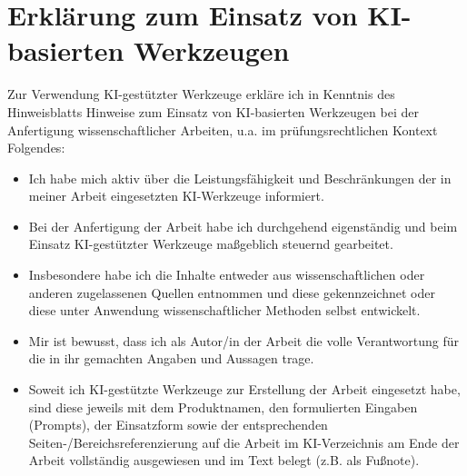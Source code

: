 \thispagestyle{fancy}

\section*{Erklärung zum Einsatz von KI-basierten Werkzeugen}

Zur Verwendung KI-gestützter Werkzeuge erkläre ich in Kenntnis des Hinweisblatts
\glqq{}Hinweise zum Einsatz von KI-basierten Werkzeugen bei der Anfertigung wissenschaftlicher Arbeiten, u.a. im prüfungsrechtlichen Kontext\grqq{} Folgendes:
    \begin{itemize}
    \item Ich habe mich aktiv über die Leistungsfähigkeit und Beschränkungen der in meiner Arbeit eingesetzten KI-Werkzeuge informiert.
    \item Bei der Anfertigung der Arbeit habe ich durchgehend eigenständig und beim Einsatz KI-gestützter Werkzeuge maßgeblich steuernd gearbeitet.
    \item Insbesondere habe ich die Inhalte entweder aus wissenschaftlichen oder anderen zugelassenen Quellen entnommen und diese gekennzeichnet oder diese unter Anwendung wissenschaftlicher Methoden selbst entwickelt.
    \item Mir ist bewusst, dass ich als Autor/in der Arbeit die volle Verantwortung für die in ihr gemachten Angaben und Aussagen trage.
    \item Soweit ich KI-gestützte Werkzeuge zur Erstellung der Arbeit eingesetzt habe, sind diese jeweils mit dem Produktnamen, den formulierten Eingaben (Prompts), der Einsatzform sowie der entsprechenden Seiten-/Bereichsreferenzierung auf die Arbeit im KI-Verzeichnis am Ende der Arbeit vollständig ausgewiesen und im Text belegt (z.B. als Fußnote). 
\end{itemize}

\newpage
\thispagestyle{fancy}

    \ifcase\myKiDirectory
        
    \or
        \begin{center}
            \\
        \end{center}
        \vspace{1cm}
        
    \else
    \fi
\newpage